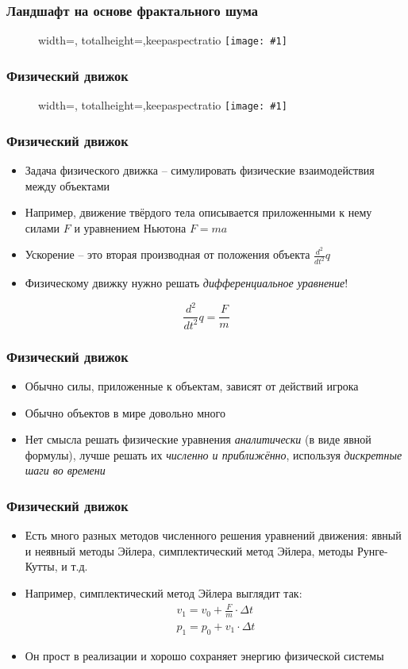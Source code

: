 \documentclass[10pt]{beamer}
\newcommand{\slideimage}[1]{
  \begin{figure}
    \begin{adjustbox}{width=\textwidth, totalheight=\textheight-2\baselineskip-2\baselineskip,keepaspectratio}
      \texttt{[image: \#1]}
    \end{adjustbox}
  \end{figure}
}
\begin{document}
\begin{frame}
\frametitle{Ландшафт на основе фрактального шума}
\slideimage{perlin-noise-terrain.png}
\end{frame}

\begin{frame}
\frametitle{Физический движок}
\slideimage{physics.png}
\end{frame}

\begin{frame}
\frametitle{Физический движок}
\begin{itemize}
\item Задача физического движка -- симулировать физические взаимодействия между объектами
\pause
\item Например, движение твёрдого тела описывается приложенными к нему силами \begin{math}F\end{math} и уравнением Ньютона \begin{math}F = ma\end{math}
\pause
\item Ускорение -- это вторая производная от положения объекта \begin{math}\frac{d^2}{dt^2}q\end{math}
\pause
\item Физическому движку нужно решать \textit{дифференциальное уравнение}!
\end{itemize}
\pause
\begin{equation*}
\frac{d^2}{dt^2}q = \frac{F}{m}
\end{equation*}
\end{frame}

\begin{frame}
\frametitle{Физический движок}
\begin{itemize}
\item Обычно силы, приложенные к объектам, зависят от действий игрока
\pause
\item Обычно объектов в мире довольно много
\pause
\item Нет смысла решать физические уравнения \textit{аналитически} (в виде явной формулы), лучше решать их \textit{численно и приближённо}, используя \textit{дискретные шаги во времени}
\end{itemize}
\end{frame}

\begin{frame}
\frametitle{Физический движок}
\begin{itemize}
\item Есть много разных методов численного решения уравнений движения: явный и неявный методы Эйлера, симплектический метод Эйлера, методы Рунге-Кутты, и т.д.
\pause
\item Например, симплектический метод Эйлера выглядит так:
\begin{gather*}
v_1 = v_0 + \frac{F}{m} \cdot \Delta t \\
p_1 = p_0 + v_1 \cdot \Delta t
\end{gather*}
\pause
\item Он прост в реализации и хорошо сохраняет энергию физической системы
\end{itemize}
\end{frame}
\end{document}
